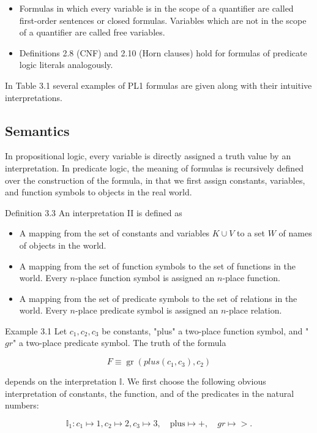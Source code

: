 \documentclass[10pt]{book}
\begin{document}
\begin{itemize}
  \item Formulas in which every variable is in the scope of a quantifier are called first-order sentences or closed formulas. Variables which are not in the scope of a quantifier are called free variables.
  \item Definitions 2.8 (CNF) and 2.10 (Horn clauses) hold for formulas of predicate logic literals analogously.
\end{itemize}
In Table 3.1 several examples of PL1 formulas are given along with their intuitive interpretations.

\subsection{Semantics}
In propositional logic, every variable is directly assigned a truth value by an interpretation. In predicate logic, the meaning of formulas is recursively defined over the construction of the formula, in that we first assign constants, variables, and function symbols to objects in the real world.

Definition 3.3 An interpretation II is defined as

\begin{itemize}
  \item A mapping from the set of constants and variables $K \cup V$ to a set $W$ of names of objects in the world.
  \item A mapping from the set of function symbols to the set of functions in the world. Every $n$-place function symbol is assigned an $n$-place function.
  \item A mapping from the set of predicate symbols to the set of relations in the world. Every $n$-place predicate symbol is assigned an $n$-place relation.
\end{itemize}

Example 3.1 Let $c_{1}, c_{2}, c_{3}$ be constants, "plus" a two-place function symbol, and "$gr$" a two-place predicate symbol. The truth of the formula

$$
F \equiv \operatorname{gr}\left(plus\left(c_{1}, c_{3}\right), c_{2}\right)
$$

depends on the interpretation $\mathbb{I}$. We first choose the following obvious interpretation of constants, the function, and of the predicates in the natural numbers:

$$
\mathbb{I}_{1}: c_{1} \mapsto 1, c_{2} \mapsto 2, c_{3} \mapsto 3, \quad \text{plus} \mapsto +, \quad gr \mapsto >.
$$
\end{document}
